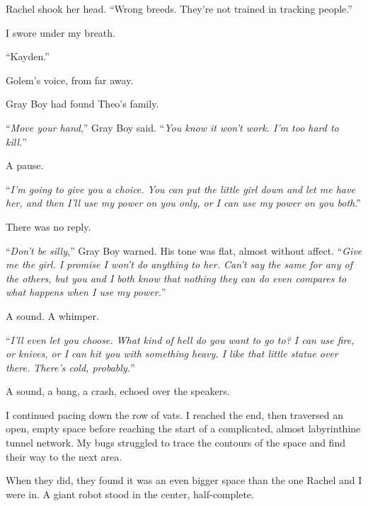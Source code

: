 Rachel shook her head.  ``Wrong breeds.  They're not trained in tracking people.''



I swore under my breath.



``Kayden.''



Golem's voice, from far away.



Gray Boy had found Theo's family.



``\emph{Move your hand},'' Gray Boy said.  ``\emph{You know it won't work.  I'm too hard to kill.}''



A pause.



``\emph{I'm going to give you a choice.  You can put the little girl down and let me have her, and then I'll use my power on you only, or I can use my power on you both}.''



There was no reply.



``\emph{Don't be silly},'' Gray Boy warned.  His tone was flat, almost without affect.  ``\emph{Give me the girl.  I promise I won't do anything to her.  Can't say the same for any of the others, but you and I both know that nothing they can do even compares to what happens when I use my power.}''



A sound.  A whimper.



``\emph{I'll even let you choose.  What kind of hell do you want to go to?  I can use fire, or knives, or I can hit you with something heavy.  I like that little statue over there.  There's cold, probably.}''



A sound, a bang, a crash, echoed over the speakers.



I continued pacing down the row of vats.  I reached the end, then traversed an open, empty space before reaching the start of a complicated, almost labyrinthine tunnel network.  My bugs struggled to trace the contours of the space and find their way to the next area.



When they did, they found it was an even bigger space than the one Rachel and I were in.  A giant robot stood in the center, half-complete.



